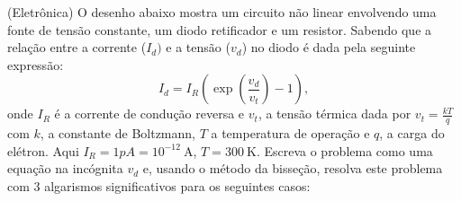 \begin{exer}(Eletrônica)\label{prob_diodo} O desenho abaixo mostra um circuito não linear envolvendo uma fonte de tensão constante, um diodo retificador e um resistor. Sabendo que a relação entre a corrente ($I_d)$ e a tensão ($v_d$) no diodo é dada pela seguinte expressão:
  \begin{equation*}
    I_d=I_R\left(\exp\left(\frac{v_d}{v_t}\right)-1\right),
  \end{equation*}
onde $I_R$ é a corrente de condução reversa e $v_t$, a tensão térmica dada por $v_t=\frac{kT}{q}$ com $k$, a constante de Boltzmann, $T$ a temperatura de operação e $q$, a carga do elétron. Aqui  $I_R=1pA=10^{-12}~\mbox{A}$, $T=300~\mbox{K}$. Escreva o problema como uma equação na incógnita $v_d$ e, usando o método da bisseção, resolva este problema com 3 algarismos significativos para os seguintes casos:
\end{exer}
